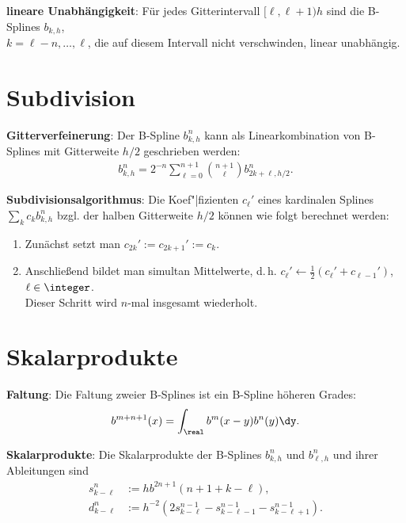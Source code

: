 \textbf{lineare Unabhängigkeit}:
Für jedes Gitterintervall $[\ell, \ell + 1)h$ sind die B-Splines $b_{k,h}$,\\
$k = \ell - n, \dotsc, \ell$, die auf diesem Intervall nicht verschwinden,
linear unabhängig.

\section{%
    Subdivision%
}

\textbf{Gitterverfeinerung}:
Der B-Spline $b_{k,h}^n$ kann als Linearkombination von B-Splines mit Gitterweite $h/2$
geschrieben werden:
\begin{align*}
    b_{k,h}^n = 2^{-n} \sum_{\ell=0}^{n+1} \binom{n+1}{\ell} b_{2k+\ell,h/2}^n.
\end{align*}

\textbf{Subdivisionsalgorithmus}:
Die Koef"|fizienten $c_\ell'$ eines kardinalen Splines $\sum_k c_k b_{k,h}^n$ bzgl. der halben
Gitterweite $h/2$ können wie folgt berechnet werden:
\begin{enumerate}
    \item
    Zunächst setzt man $c_{2k}' := c_{2k+1}' := c_k$.

    \item
    Anschließend bildet man simultan Mittelwerte, d.\,h.
    $c_\ell' \leftarrow \frac{1}{2} (c_\ell' + c_{\ell-1}')$, $\ell \in \integer$.\\
    Dieser Schritt wird $n$-mal insgesamt wiederholt.
\end{enumerate}

\pagebreak

\section{%
    Skalarprodukte%
}

\textbf{Faltung}:
Die Faltung zweier B-Splines ist ein B-Spline höheren Grades:
\begin{align*}
    b^{m+n+1}(x) = \int_\real b^m(x - y) b^n(y) \dy.
\end{align*}

\textbf{Skalarprodukte}:
Die Skalarprodukte der B-Splines $b_{k,h}^n$ und $b_{\ell,h}^n$ und ihrer Ableitungen sind
\begin{align*}
    s_{k-\ell}^n &:= h b^{2n+1} (n + 1 + k - \ell),\\
    d_{k-\ell}^n &:= h^{-2} (2s_{k-\ell}^{n-1} - s_{k-\ell-1}^{n-1} - s_{k-\ell+1}^{n-1}).
\end{align*}


